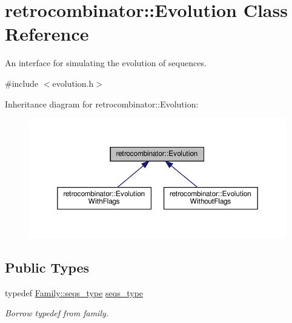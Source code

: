 \hypertarget{classretrocombinator_1_1Evolution}{}\section{retrocombinator\+:\+:Evolution Class Reference}
\label{classretrocombinator_1_1Evolution}


An interface for simulating the evolution of sequences.  




{\ttfamily \#include $<$evolution.\+h$>$}



Inheritance diagram for retrocombinator\+:\+:Evolution\+:
\nopagebreak
\begin{figure}[H]
\begin{center}
\leavevmode
\includegraphics[width=350pt]{classretrocombinator_1_1Evolution__inherit__graph}
\end{center}
\end{figure}
\subsection*{Public Types}
\begin{DoxyCompactItemize}
\item 
\mbox{\label{classretrocombinator_1_1Evolution_a3a0a2c09c39e368fe321fbf2e6b8af8d}} 
typedef \hyperlink{classretrocombinator_1_1Family_a994b8646d1c0c4e19420d2e5c6c53c85}{Family\+::seqs\+\_\+type} \hyperlink{classretrocombinator_1_1Evolution_a3a0a2c09c39e368fe321fbf2e6b8af8d}{seqs\+\_\+type}
\begin{DoxyCompactList}\small\item\em Borrow typedef from family. \end{DoxyCompactList}\end{DoxyCompactItemize}
